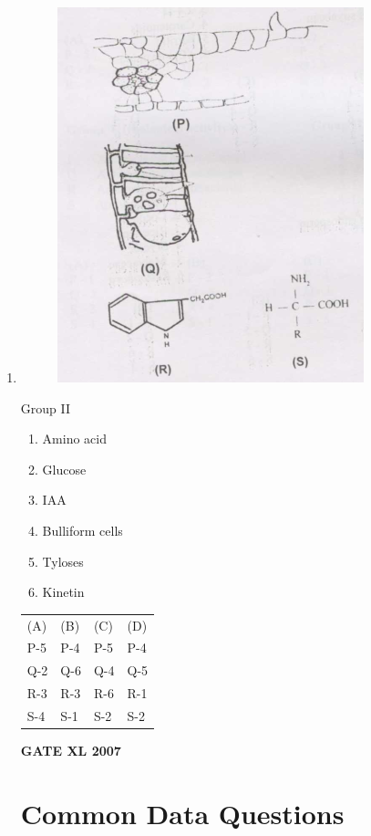 \documentclass[journal,12pt,onecolumn]{IEEEtran}
\begin{document}
\begin{enumerate}
\clearpage
    \item 
		    \begin{flushleft}
			    \begin{figure}[]
	\centering
	\includegraphics[width=0.5\columnwidth]{22match.png}
	\caption*{}
	\label{fig:Q22match}
	\end{figure}
		    \end{flushleft}
	    \begin{minipage}{0.5\columnwidth}
		    \begin{flushleft}
		    Group II
    \begin{enumerate}
        \item Amino acid
        \item Glucose
        \item IAA
        \item Bulliform cells
        \item Tyloses
        \item Kinetin
    \end{enumerate}
		    \end{flushleft}
	    \end{minipage}
    \begin{tabular}{l l l l}
     (A) & (B) & (C) & (D) \\
     P-5 & P-4 & P-5 & P-4 \\
     Q-2 & Q-6 & Q-4 & Q-5 \\
     R-3 & R-3 & R-6 & R-1 \\
     S-4 & S-1 & S-2 & S-2 \\
    \end{tabular}
\hfill{\textbf{GATE XL 2007}}
\section*{Common Data Questions}

\end{enumerate}
\end{document}
